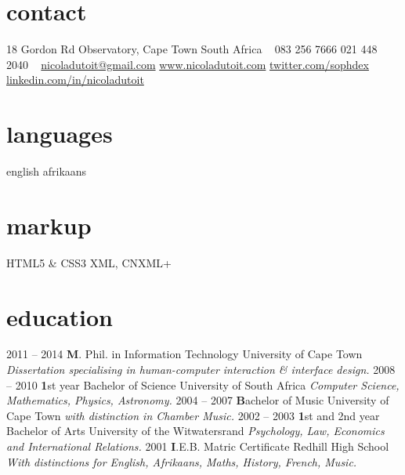 \documentclass[]{friggeri-cv} %
\begin{document}


\begin{aside} %
\section{contact}
18 Gordon Rd
Observatory, Cape Town
South Africa
~
083 256 7666
021 448 2040
~
\href{mailto:nicoladutoit@gmail.com}{nicoladutoit@gmail.com}
\href{http://www.nicoladutoit.com}{www.nicoladutoit.com}
\href{https://twitter.com/sophdex}{twitter.com/sophdex}
\hspace{-20pt}\href{http://za.linkedin.com/in/nicoladutoit/}{linkedin.com/in/nicoladutoit}
\section{languages}
english 
afrikaans
\section{markup}
HTML5 \& CSS3
XML, CNXML+
\end{aside}


\section{education}

\begin{entrylist}
\entry
{2011 -- 2014}
{\textbf M. Phil. in Information Technology}
{University of Cape Town}
{\emph{Dissertation specialising in human-computer interaction \& interface design.}}
\entry
{2008 -- 2010}
{\textbf 1st year Bachelor of Science}
{University of South Africa}
{\emph{Computer Science, Mathematics, Physics, Astronomy.}}
\entry
{2004 -- 2007}
{\textbf Bachelor of Music}
{University of Cape Town}
{\emph{with distinction in Chamber Music.}}
\entry
{2002 -- 2003}
{\textbf 1st and 2nd year Bachelor of Arts}
{University of the Witwatersrand}
{\emph{Psychology, Law, Economics and International Relations.}}
\entry
{2001}
{\textbf I.E.B. Matric Certificate }
{Redhill High School}
{\emph{With distinctions for English, Afrikaans, Maths, History, French, Music.}}

\end{entrylist}
\end{document}
